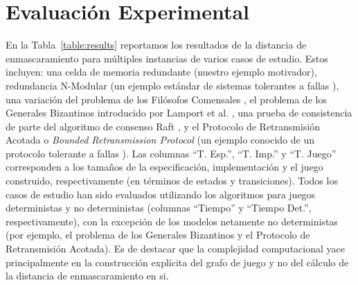 \section{Evaluación Experimental}
\label{sec:experimental_eval_mask}


En la Tabla~\ref{table:results} reportamos los resultados de la distancia de enmascaramiento para múltiples instancias de varios casos de estudio. Estos incluyen: una celda de memoria redundante (nuestro ejemplo motivador), redundancia N-Modular (un ejemplo estándar de sistemas tolerantes a fallas \cite{ShoomanBook}), una variación del problema de los Filósofos Comensales \cite{Dijkstra71}, el problema de los Generales Bizantinos introducido por Lamport et al. \cite{LamportSP82}, una prueba de consistencia de parte del algoritmo de consenso Raft \cite{OngaroO14}, y el Protocolo de Retransmisión Acotada o \textit{Bounded Retransmission Protocol} (un ejemplo conocido de un protocolo tolerante a fallas \cite{GrooteP96}). Las columnas ``T. Esp.'', ``T. Imp.'' y ``T. Juego'' corresponden a los tamaños de la especificación, implementación y el juego construido, respectivamente (en términos de estados y transiciones). Todos los casos de estudio han sido evaluados utilizando los algoritmos para juegos deterministas y no deterministas (columnas ``Tiempo'' y ``Tiempo Det.'', respectivamente), con la excepción de los modelos netamente no deterministas (por ejemplo, el problema de los Generales Bizantinos y el Protocolo de Retransmisión Acotada). Es de destacar que la complejidad computacional yace principalmente en la construcción explícita del grafo de juego y no del cálculo de la distancia de enmascaramiento en si.

